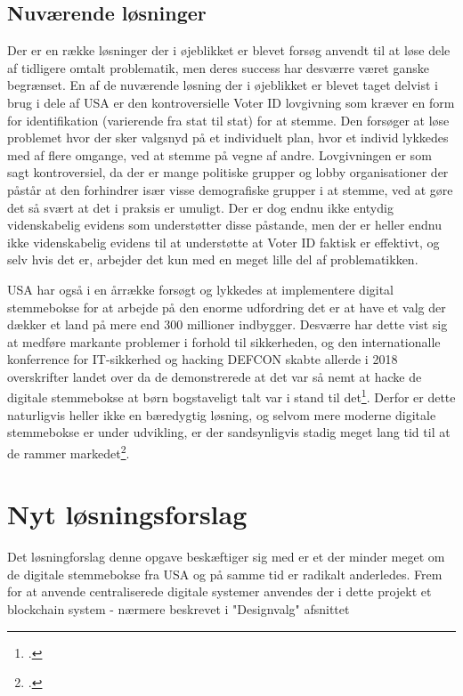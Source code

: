 \documentclass[a4paper, 8pt, oneside]{article} %
\begin{document}
\subsection{Nuværende løsninger}
Der er en række løsninger der i øjeblikket er blevet forsøg anvendt til at løse dele af tidligere omtalt problematik, men deres success har desværre været ganske begrænset. En af de nuværende løsning der i øjeblikket er blevet taget delvist i brug i dele af USA er den kontroversielle Voter ID lovgivning som kræver en form for identifikation (varierende fra stat til stat) for at stemme. Den forsøger at løse problemet hvor der sker valgsnyd på et individuelt plan, hvor et individ lykkedes med af flere omgange, ved at stemme på vegne af andre. Lovgivningen er som sagt kontroversiel, da der er mange politiske grupper og lobby organisationer der påstår at den forhindrer især visse demografiske grupper i at stemme, ved at gøre det så svært at det i praksis er umuligt. Der er dog endnu ikke entydig videnskabelig evidens som understøtter disse påstande, men der er heller endnu ikke videnskabelig evidens til at understøtte at Voter ID faktisk er effektivt, og selv hvis det er, arbejder det kun med en meget lille del af problematikken.

USA har også i en årrække forsøgt og lykkedes at implementere digital stemmebokse for at arbejde på den enorme udfordring det er at have et valg der dækker et land på mere end 300 millioner indbygger. Desværre har dette vist sig at medføre markante problemer i forhold til sikkerheden, og den internationalle konferrence for IT-sikkerhed og hacking DEFCON skabte allerde i 2018 overskrifter landet over da de demonstrerede at det var så nemt at hacke de digitale stemmebokse at børn bogstaveligt talt var i stand til det\footcite{hern_kids_2018}. Derfor er dette naturligvis heller ikke en bæredygtig løsning, og selvom mere moderne digitale stemmebokse er under udvikling, er der sandsynligvis stadig meget lang tid til at de rammer markedet\footcite{ng_darpas_nodate}.

\section{Nyt løsningsforslag}
Det løsningforslag denne opgave beskæftiger sig med er et der minder meget om de digitale stemmebokse fra USA og på samme tid er radikalt anderledes. Frem for at anvende centraliserede digitale systemer anvendes der i dette projekt et blockchain system - nærmere beskrevet i "Designvalg" afsnittet
\end{document}
